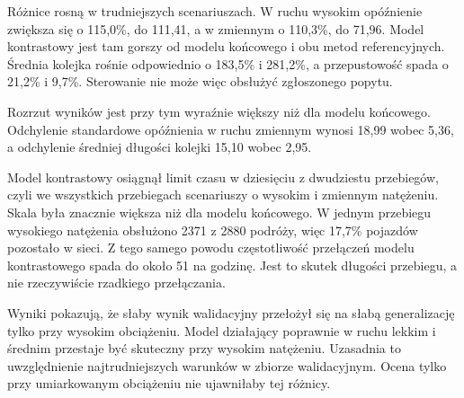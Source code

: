 Różnice rosną w trudniejszych scenariuszach. W ruchu wysokim opóźnienie zwiększa się o 115,0\%, do 111,41, a w zmiennym o 110,3\%, do 71,96. Model kontrastowy jest tam gorszy od modelu końcowego i obu metod referencyjnych. Średnia kolejka rośnie odpowiednio o 183,5\% i 281,2\%, a przepustowość spada o 21,2\% i 9,7\%. Sterowanie nie może więc obsłużyć zgłoszonego popytu.

Rozrzut wyników jest przy tym wyraźnie większy niż dla modelu końcowego. Odchylenie standardowe opóźnienia w ruchu zmiennym wynosi 18,99 wobec 5,36, a odchylenie średniej długości kolejki 15,10 wobec 2,95.

Model kontrastowy osiągnął limit czasu w dziesięciu z dwudziestu przebiegów, czyli we wszystkich przebiegach scenariuszy o wysokim i zmiennym natężeniu. Skala była znacznie większa niż dla modelu końcowego. W jednym przebiegu wysokiego natężenia obsłużono 2371 z 2880 podróży, więc 17,7\% pojazdów pozostało w sieci. Z tego samego powodu częstotliwość przełączeń modelu kontrastowego spada do około 51 na godzinę. Jest to skutek długości przebiegu, a nie rzeczywiście rzadkiego przełączania.

Wyniki pokazują, że słaby wynik walidacyjny przełożył się na słabą generalizację tylko przy wysokim obciążeniu. Model działający poprawnie w ruchu lekkim i średnim przestaje być skuteczny przy wysokim natężeniu. Uzasadnia to uwzględnienie najtrudniejszych warunków w zbiorze walidacyjnym. Ocena tylko przy umiarkowanym obciążeniu nie ujawniłaby tej różnicy.
